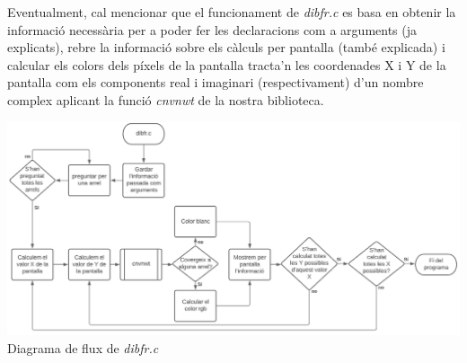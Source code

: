 \documentclass[12pt]{report}
\begin{document}
\newline
Eventualment, cal mencionar que el funcionament de \textit{dibfr.c} es basa en obtenir la informació necessària per a poder fer les declaracions com a arguments (ja explicats), rebre la informació sobre els càlculs per pantalla (també explicada) i calcular els colors dels píxels de la pantalla tracta'n les coordenades X i Y de la pantalla com els components real i imaginari (respectivament) d'un nombre complex aplicant la funció \textit{cnvnwt} de la nostra biblioteca.
\begin{center}
    \includegraphics[width=1\textwidth]{UML_dibfr.PNG}
     \newline
Diagrama de flux de \textit{dibfr.c}
\label{fig:UML_dibfr}
\end{center}



\end{document}

